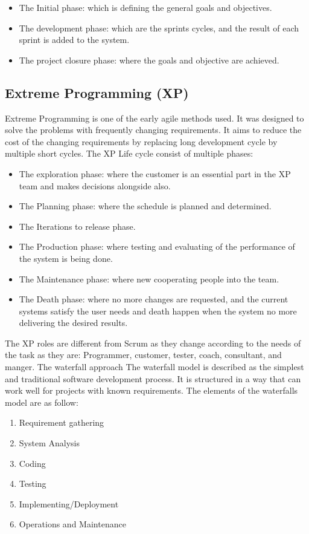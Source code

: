 \documentclass[conference,onecolumn]{IEEEtran}
\begin{document}
	\begin{itemize}
		\item The Initial phase: which is defining the general goals and objectives.
		\item The development phase: which are the sprints cycles, and the result of each sprint is added to the system.
		\item The project closure phase: where the goals and objective are achieved.
	\end{itemize}

\subsection{Extreme Programming (XP)}
	Extreme Programming is one of the early agile methods used. It was designed to solve the problems with frequently changing requirements. It aims to reduce the cost of the changing requirements by replacing long development cycle by multiple short cycles. The XP Life cycle consist of multiple phases:

	\begin{itemize}
		\item The exploration phase: where the customer is an essential part in the XP team and makes decisions alongside also.
		\item The Planning phase: where the schedule is planned and determined.
		\item The Iterations to release phase.
		\item The Production phase: where testing and evaluating of the performance of the system is being done.
		\item The Maintenance phase: where new cooperating people into the team.
		\item The Death phase: where no more changes are requested, and the current systems satisfy the user needs and death happen when the system no more delivering the desired results.
	\end{itemize}

	The XP roles are different from Scrum as they change according to the needs of the task as they are: Programmer, customer, tester, coach, consultant, and manger.
	The waterfall approach
	The waterfall model is described as the simplest and traditional software development process. It is structured in a way that can work well for projects with known requirements. The elements of the waterfalls model are as follow:
	\begin{multicols}{2}
		\begin{enumerate}
			\item Requirement gathering
			\item System Analysis
			\item Coding
			\item Testing
			\item Implementing/Deployment
			\item Operations and Maintenance
		\end{enumerate}
	\end{multicols}
\end{document}
